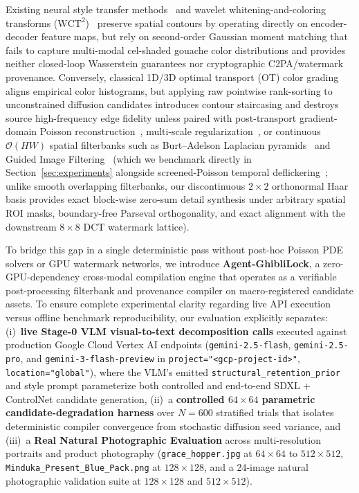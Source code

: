 \documentclass[conference,10pt]{IEEEtran}
\begin{document}
Existing neural style transfer methods~\cite{gatys2016} and wavelet whitening-and-coloring transforms ($\text{WCT}^2$)~\cite{yoo2019wct2} preserve spatial contours by operating directly on encoder-decoder feature maps, but rely on second-order Gaussian moment matching that fails to capture multi-modal cel-shaded gouache color distributions and provides neither closed-loop Wasserstein guarantees nor cryptographic C2PA/watermark provenance. Conversely, classical 1D/3D optimal transport (OT) color grading~\cite{pitie2007automated,rabin2011,bonneel2015} aligns empirical color histograms, but applying raw pointwise rank-sorting to unconstrained diffusion candidates introduces contour staircasing and destroys source high-frequency edge fidelity unless paired with post-transport gradient-domain Poisson reconstruction~\cite{pitie2007automated}, multi-scale regularization~\cite{rabin2011,bonneel2015}, or continuous $\mathcal{O}(HW)$ spatial filterbanks such as Burt--Adelson Laplacian pyramids~\cite{burt1983} and Guided Image Filtering~\cite{he2013guided} (which we benchmark directly in Section~\ref{sec:experiments} alongside screened-Poisson temporal deflickering~\cite{bonneel2015blind}; unlike smooth overlapping filterbanks, our discontinuous $2\times 2$ orthonormal Haar basis provides exact block-wise zero-sum detail synthesis under arbitrary spatial ROI masks, boundary-free Parseval orthogonality, and exact alignment with the downstream $8\times 8$ DCT watermark lattice).

To bridge this gap in a single deterministic pass without post-hoc Poisson PDE solvers or GPU watermark networks, we introduce \textbf{Agent-GhibliLock}, a zero-GPU-dependency cross-modal compilation engine that operates as a verifiable post-processing filterbank and provenance compiler on macro-registered candidate assets. To ensure complete experimental clarity regarding live API execution versus offline benchmark reproducibility, our evaluation explicitly separates: (i)~\textbf{live Stage-0 VLM visual-to-text decomposition calls} executed against production Google Cloud Vertex AI endpoints (\texttt{gemini-2.5-flash}, \texttt{gemini-2.5-pro}, and \texttt{gemini-3-flash-preview} in \texttt{project="<gcp-project-id>"}, \texttt{location="global"}), where the VLM's emitted \texttt{structural\_retention\_prior} and style prompt parameterize both controlled and end-to-end SDXL + ControlNet candidate generation, (ii)~a \textbf{controlled $64\times 64$ parametric candidate-degradation harness} over $N=600$ stratified trials that isolates deterministic compiler convergence from stochastic diffusion seed variance, and (iii)~a \textbf{Real Natural Photographic Evaluation} across multi-resolution portraits and product photography (\texttt{grace\_hopper.jpg} at $64\times 64$ to $512\times 512$, \texttt{Minduka\_Present\_Blue\_Pack.png} at $128\times 128$, and a 24-image natural photographic validation suite at $128\times 128$ and $512\times 512$).
\end{document}
